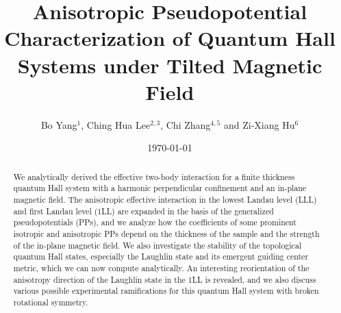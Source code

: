 \documentclass[twocolumn,showpacs,amsmath,amstex,amssymb,mathfonts,prb]{revtex4-1}
\begin{document}
\title{Anisotropic Pseudopotential Characterization of Quantum Hall Systems under Tilted Magnetic Field}

\author{Bo Yang$^1$, Ching Hua Lee$^{2,3}$, Chi Zhang$^{4,5}$ and Zi-Xiang Hu$^{6}$}


\date{\today}
\begin{abstract}
We analytically derived the effective two-body interaction for a finite thickness quantum Hall system with a harmonic perpendicular confinement and an in-plane magnetic field. The anisotropic effective interaction in the lowest Landau level (LLL) and first Landau level (1LL) are expanded in the basis of the generalized pseudopotentials (PPs), and we analyze how the coefficients of some prominent isotropic and anisotropic PPs depend on the thickness of the sample and the strength of the in-plane magnetic field. We also investigate the stability of the topological quantum Hall states, especially the Laughlin state and its emergent guiding center metric, which we can now compute analytically. An interesting reorientation of the anisotropy direction of the Laughlin state in the 1LL is revealed, and we also discuss various possible experimental ramifications for this quantum Hall system with broken rotational symmetry.
\end{abstract}
%

\maketitle 
\end{document}
